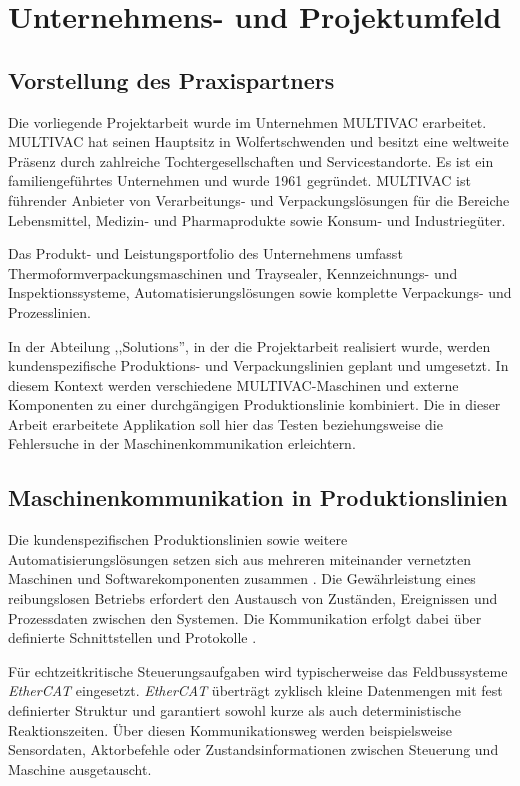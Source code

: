 \chapter{Unternehmens- und Projektumfeld}
\label{cha:Unternehmens- und Projektumfeld}

\section{Vorstellung des Praxispartners}
Die vorliegende Projektarbeit wurde im Unternehmen MULTIVAC erarbeitet. MULTIVAC hat seinen Hauptsitz in Wolfertschwenden und besitzt eine weltweite Präsenz durch zahlreiche Tochtergesellschaften und Servicestandorte. Es ist ein familiengeführtes Unternehmen und wurde 1961 gegründet. MULTIVAC ist führender Anbieter von Verarbeitungs- und Verpackungslösungen für die Bereiche Lebensmittel, Medizin- und Pharmaprodukte sowie Konsum- und Industriegüter. \autocite{UeberUns}

Das Produkt- und Leistungsportfolio des Unternehmens umfasst Thermoformverpackungsmaschinen und Traysealer, Kennzeichnungs- und Inspektionssysteme, Automatisierungslösungen sowie komplette Verpackungs- und Prozesslinien. \autocite{Portfolio}

In der Abteilung ,,Solutions'', in der die Projektarbeit realisiert wurde, werden kundenspezifische Produktions- und Verpackungslinien geplant und umgesetzt. In diesem Kontext werden verschiedene MULTIVAC-Maschinen und externe Komponenten zu einer durchgängigen Produktionslinie kombiniert. Die in dieser Arbeit erarbeitete Applikation soll hier das Testen beziehungsweise die Fehlersuche in der Maschinenkommunikation erleichtern.

\section{Maschinenkommunikation in Produktionslinien}
Die kundenspezifischen Produktionslinien sowie weitere Automatisierungslösungen setzen sich aus mehreren miteinander vernetzten Maschinen und Softwarekomponenten zusammen \autocite{Automatisierungsloesungen}. Die Gewährleistung eines reibungslosen Betriebs erfordert den Austausch von Zuständen, Ereignissen und Prozessdaten zwischen den Systemen. Die Kommunikation erfolgt dabei über definierte Schnittstellen und Protokolle \autocite[19--20]{EtherCAT}. 

Für echtzeitkritische Steuerungsaufgaben wird typischerweise das Feldbussysteme \textit{EtherCAT} eingesetzt. \textit{EtherCAT} überträgt zyklisch kleine Datenmengen mit fest definierter Struktur und garantiert sowohl kurze als auch deterministische Reaktionszeiten. Über diesen Kommunikationsweg werden beispielsweise Sensordaten, Aktorbefehle oder Zustandsinformationen zwischen Steuerung und Maschine ausgetauscht. \autocite[287--290]{EtherCAT}

